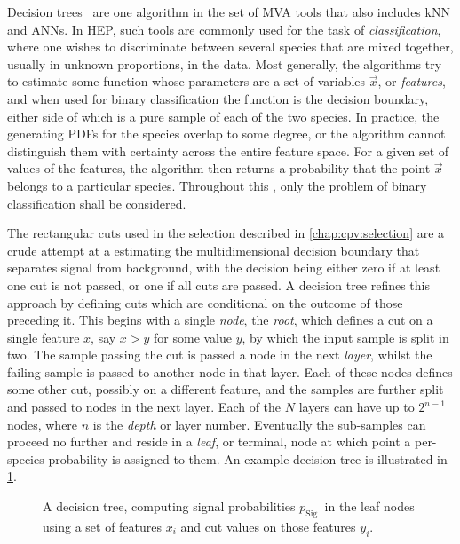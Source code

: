 Decision trees~\cite{breiman1984classification,Louppe:14077502} are one 
algorithm in the set of \acl{MVA} tools that also includes \acl{kNN} and 
\aclp{ANN}.
In \acl{HEP}, such tools are commonly used for the task of 
\emph{classification}, where one wishes to discriminate between several species 
that are mixed together, usually in unknown proportions, in the data.
Most generally, the algorithms try to estimate some function whose parameters 
are a set of variables $\vec{x}$, or \emph{features}, and when used for binary 
classification the function is the decision boundary, either side of which is a 
pure sample of each of the two species.
In practice, the generating \acp{PDF} for the species overlap to some degree, 
or the algorithm cannot distinguish them with certainty across the entire 
feature space.
For a given set of values of the features, the algorithm then returns a 
probability that the point $\vec{x}$ belongs to a particular species.
Throughout this , only the 
problem of binary classification shall be considered.

The rectangular cuts used in the selection described in 
\cref{chap:cpv:selection} are a crude attempt at a estimating the 
multidimensional decision boundary that separates signal from background, with 
the decision being either zero if at least one cut is not passed, or one if all 
cuts are passed.
A decision tree refines this approach by defining cuts which are conditional on 
the outcome of those preceding it.
This begins with a single \emph{node}, the \emph{root}, which defines a cut on 
a single feature $x$, say $x > y$ for some value $y$, by which the input sample 
is split in two.
The sample passing the cut is passed a node in the next \emph{layer}, whilst 
the failing sample is passed to another node in that layer.
Each of these nodes defines some other cut, possibly on a different feature, 
and the samples are further split and passed to nodes in the next layer.
Each of the $N$ layers can have up to $2^{n - 1}$ nodes, where $n$ is the 
\emph{depth} or layer number.
Eventually the sub-samples can proceed no further and reside in a \emph{leaf}, 
or terminal, node at which point a per-species probability is assigned to them.
An example decision tree is illustrated in 
\cref{fig:cpv:kinematic_weighting:decision_tree}.

\begin{figure}
  \centering
  
  \caption{%
    A decision tree, computing signal probabilities $p_{\text{Sig.}}$ in the 
    leaf nodes using a set of features $x_{i}$ and cut values on those features 
    $y_{i}$.
  }
  \label{fig:cpv:kinematic_weighting:decision_tree}
\end{figure}

